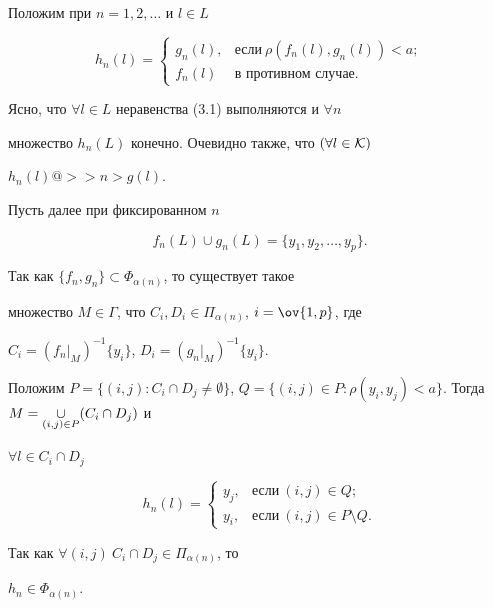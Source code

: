 \begin{pf} 


Положим при $n=1,2,\dotsc$ и $l\in L$ 


$$ 


h_n(l)= 


\begin{cases} 


g_n(l), & \text{если} \ \rho(f_n(l),g_n(l))<a;\\ 


f_n(l) & \text{в противном случае}. 


\end{cases} 


$$ 


Ясно, что $\forall l\in L$ неравенства (3.1) выполняются и $\forall n$ 


множество $h_n(L)$ конечно. Очевидно также, что $(\forall l\in\cal K)$ 


$h_n(l)@>>n>g(l)$. 


 


Пусть далее при фиксированном $n$ 


$$ 


f_n(L)\cup g_n(L)=\{y_1,y_2,\dotsc,y_p\}. 


$$ 


Так как $\{f_n,g_n\}\subset\Phi_{\alpha(n)}$, то существует такое 


множество $M\in\Gamma$, что $C_i,D_i\in\Pi_{\alpha(n)}$, $i=\ov{1,p}$, где 


$C_i=(f_n|_M)^{-1}\{y_i\}$, $D_i=(g_n|_M)^{-1}\{y_i\}$. 


 


Положим $P=\{(i,j):C_i\cap D_j\ne\emptyset\}$, $Q=\{(i,j)\in P: 


\rho(y_i,y_j)<a\}$. Тогда $M=\mycup_{(i,j)\in P}(C_i\cap D_j)$ и 


$\forall l\in C_i\cap D_j$ 


$$ 


h_n(l)= 


\begin{cases} 


y_j, &\text{если}\ (i,j)\in Q;\\ 


y_i, & \text{если}\ (i,j)\in P\setminus Q. 


\end{cases} 


$$ 


Так как $\forall (i,j)\ C_i\cap D_j\in\Pi_{\alpha(n)}$, то 


$h_n\in\Phi_{\alpha(n)}$. 


\end{pf} 


